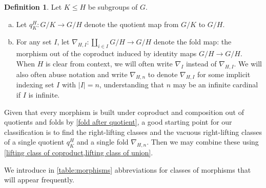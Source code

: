 \documentclass{amsart}
\numberwithin{equation}{section}
\theoremstyle{definition}
\newtheorem{definition}[equation]{Definition}
\begin{document}
\begin{definition}
	\label{def quotient and fold}
	Let $K \leq H$ be subgroups of $G$.
	\begin{enumerate}[(a)]
		\item Let
		      \(
		      q^H_K \colon G/K \to G/H
		      \)
		      denote the quotient map from $G/K$ to $G/H$.
		\item For any set $I$, let
		      \(
		      \nabla_{H,I} \colon \coprod_{i \in I} G/H \to G/H
		      \)
		      denote the fold map: the morphism out of the coproduct induced by identity maps $G/H \to G/H$. When $H$ is clear from context, we will often write $\nabla_{I}$ instead of $\nabla_{H,I}$. We will also often abuse notation and write $\nabla_{H,n}$ to denote $\nabla_{H,I}$ for some implicit indexing set $I$ with $\lvert I \rvert = n$, understanding that $n$ may be an infinite cardinal if $I$ is infinite.
	\end{enumerate}
\end{definition}


Given that every morphism is built under coproduct and composition out of quotients and folds by \cref{fold after quotient}, a good starting point for our classification is to find the right-lifting classes and the vacuous right-lifting classes of a single quotient $q^H_K$ and a single fold $\nabla_{H,n}$. Then we may combine these using \cref{lifting class of coproduct,lifting class of union}.

We introduce in \cref{table:morphisms} abbreviations for classes of morphisms that will appear frequently.
\end{document}
